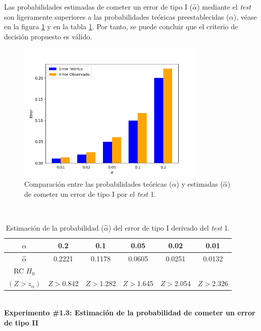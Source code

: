 \documentclass[12pt]{report}
\begin{document}
Las probabilidades estimadas de cometer un error de tipo I ($\hat{\alpha}$) mediante el \textit{test} son ligeramente superiores  a las probabilidades teóricas preestablecidas ($\alpha$), véase en la figura \ref{Teorico vs Observado} y en la tabla \ref{3td:error1-prob}. Por tanto, se puede concluir que el criterio de decisión propuesto es válido.
	\begin{figure}[ht]
	\centering
	
	\includegraphics[width=0.8\textwidth]{3td_teo_obs.png}
	\caption{Comparación entre las probabilidades teóricas ($\alpha$) y estimadas ($\hat{\alpha}$) de cometer un error de tipo I por el \textit{test} 1. }
	\label{Teorico vs Observado}
\end{figure}\\
\begin{table}[h!]
	\centering
		\caption{Estimación de la probabilidad ($\hat{\alpha}$) del error de tipo I derivado del \textit{test} 1.}
	\begin{tabular}{|c|ccccc|}
		\hline
		$\alpha$ &  0.2 &  0.1 &  0.05 & 0.02 &  0.01 \\
		\hline
		$\hat{\alpha}$ & 0.2221 & 0.1178 & 0.0605 & 0.0251 & 0.0132 \\
		\hline
		RC $H_0$      &         &         &        &        &  \\
		 $(Z>z_\alpha)$&  $Z>$0.842& $Z>$1.282& $Z>$1.645& $Z>$2.054& $Z>$2.326 \\
		\hline
	\end{tabular}

	\label{3td:error1-prob}
\end{table}
\\
\textbf{Experimento \#1.3: Estimación de la probabilidad de cometer un error de tipo II}
\end{document}
